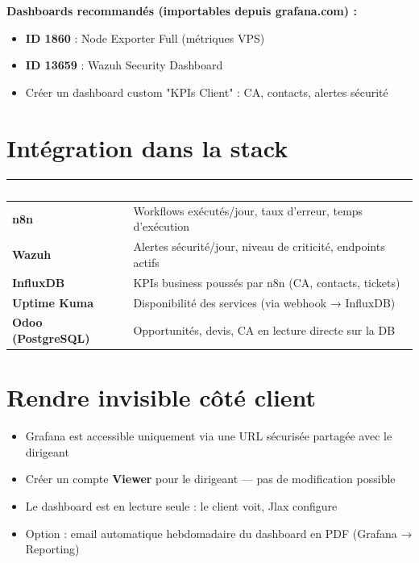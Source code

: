 \documentclass[11pt, a4paper]{article}
\begin{document}
\textbf{Dashboards recommandés (importables depuis grafana.com) :}
\begin{itemize}
  \item \textbf{ID 1860} : Node Exporter Full (métriques VPS)
  \item \textbf{ID 13659} : Wazuh Security Dashboard
  \item Créer un dashboard custom "KPIs Client" : CA, contacts, alertes sécurité
\end{itemize}

\section{Intégration dans la stack}

\begin{center}
\renewcommand{\arraystretch}{1.4}
\begin{tabularx}{\linewidth}{>{\bfseries}p{2.8cm} X}
\toprule
\rowcolor{tabheader}
\textcolor{white}{\textbf{Source de données}} & \textcolor{white}{\textbf{Métriques exposées}} \\
\midrule
n8n & Workflows exécutés/jour, taux d'erreur, temps d'exécution \\
\rowcolor{rowgray}
Wazuh & Alertes sécurité/jour, niveau de criticité, endpoints actifs \\
InfluxDB & KPIs business poussés par n8n (CA, contacts, tickets) \\
\rowcolor{rowgray}
Uptime Kuma & Disponibilité des services (via webhook → InfluxDB) \\
Odoo (PostgreSQL) & Opportunités, devis, CA en lecture directe sur la DB \\
\bottomrule
\end{tabularx}
\end{center}

\section{Rendre invisible côté client}

\begin{itemize}
  \item Grafana est accessible uniquement via une URL sécurisée partagée avec le dirigeant
  \item Créer un compte \textbf{Viewer} pour le dirigeant — pas de modification possible
  \item Le dashboard est en lecture seule : le client voit, Jlax configure
  \item Option : email automatique hebdomadaire du dashboard en PDF (Grafana → Reporting)
\end{itemize}
\end{document}
